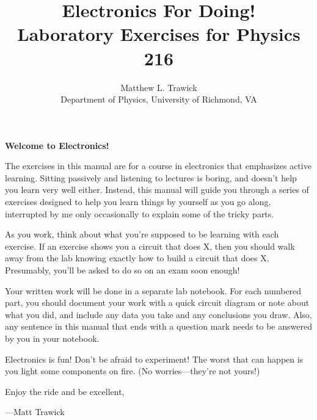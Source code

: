 \title{Electronics For Doing!\\
Laboratory Exercises for Physics 216}

\author{Matthew L. Trawick\\[4pt]
Department of Physics, University of Richmond, VA \\[4pt]
}

\maketitle

\vspace{0.4 in}


\begin{center}
\large{\textbf{Welcome to Electronics!}}
\end{center}

The exercises in this manual are for a course in electronics that emphasizes active learning. 
Sitting passively and listening to lectures is boring, and doesn't help you learn very well either.
Instead, this manual will guide you through a series of exercises designed to help you learn things by yourself as you go along, interrupted by me only occasionally to explain some of the tricky parts.

As you work, think about what you're supposed to be learning with each exercise.  If an exercise shows you a circuit that does X, then you should walk away from the lab knowing exactly how to build a circuit that does X.  Presumably, you'll be asked to do so on an exam soon enough!

Your written work will be done in a separate lab notebook.  For each numbered part, you should document your work with a quick circuit diagram or note about what you did, and include any data you take and any conclusions you draw.  Also, any sentence in this manual that ends with a question mark needs to be answered by you in your notebook.

Electronics is fun!  Don't be afraid to experiment!  The worst that can happen is you light some components on fire.  (No worries---they're not yours!)

Enjoy the ride and be excellent,

---Matt Trawick


\newpage
\
\thispagestyle{plain}

\newpage
\


